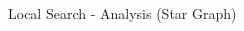 \begin{frame}{Local Search - Analysis (Star Graph)}
\begin{columns}
\begin{column}{1.2\textwidth}
\begin{center}

\end{center}
\end{column}
\end{columns}
\end{frame}